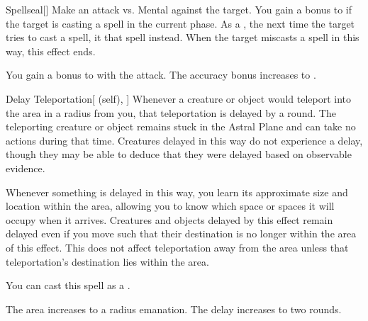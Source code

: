 \lowercase{\hypertarget{spell:Spellseal}{}}\label{spell:Spellseal}
\begin{freeability}[Rank 3]{\hypertarget{spell:Spellseal}{Spellseal}}[]
Make an attack vs. Mental against the target.
You gain a  bonus to  if the target is casting a spell in the current phase.
\hit As a , the next time the target tries to cast a spell, it  that spell instead.
When the target miscasts a spell in this way, this effect ends.

\rankline
{} You gain a  bonus to  with the attack.
 The accuracy bonus increases to .
\end{freeability}
\vspace{0.25em}



\lowercase{\hypertarget{spell:Delay Teleportation}{}}\label{spell:Delay Teleportation}
\begin{attuneability}[Rank 4]{\hypertarget{spell:Delay Teleportation}{Delay Teleportation}}[ (self), ]
Whenever a creature or object would teleport into the area in a \arealarge radius  from you, that teleportation is delayed by a round.
The teleporting creature or object remains stuck in the Astral Plane and can take no actions during that time.
Creatures delayed in this way do not experience a delay, though they may be able to deduce that they were delayed based on observable evidence.

Whenever something is delayed in this way, you learn its approximate size and location within the area, allowing you to know which space or spaces it will occupy when it arrives.
Creatures and objects delayed by this effect remain delayed even if you move such that their destination is no longer within the area of this effect.
This does not affect teleportation away from the area unless that teleportation's destination lies within the area.

You can cast this spell as a .

\rankline
{} The area increases to a \areahuge radius emanation.
 The delay increases to two rounds.
\end{attuneability}
\vspace{0.25em}



